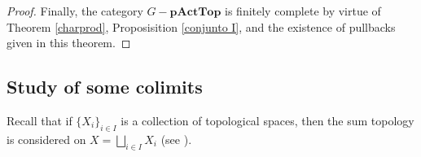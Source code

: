 \documentclass[sn-mathphys-num]{sn-jnl}%
\theoremstyle{thmstyleone}%
\theoremstyle{thmstyletwo}%
\theoremstyle{thmstylethree}%
\begin{document}
\begin{proof}[Proof]
Finally, the category $G-\mathbf{pActTop}$ is finitely complete by virtue of Theorem \ref{charprod}, Proposisition \ref{conjunto I}, and the existence of pullbacks given in this theorem.
\end{proof}




\subsection{Study of some colimits}

Recall that if $ \{X_i \}_{i \in I} $ is a collection of topological spaces, then the sum topology is considered on $ X = \bigsqcup_{i \in I} X_i $ (see \cite{munkres}).\\
\end{document}
